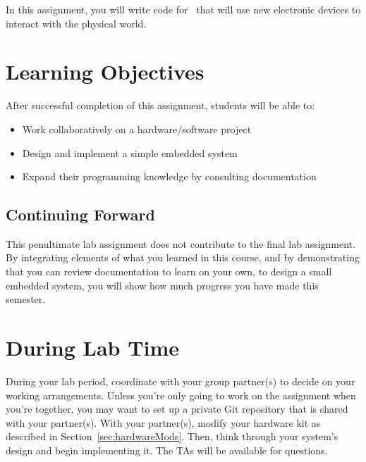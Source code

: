 In this assignment, you will write code for \runtimeenvironment\ that will use new electronic devices to interact with the physical world.


\tableofcontents

\section*{Learning Objectives}

After successful completion of this assignment, students will be able to:
\begin{itemize}
    \item Work collaboratively on a hardware/software project
    \item Design and implement a simple embedded system
    \item Expand their programming knowledge by consulting documentation
\end{itemize}

\subsection*{Continuing Forward}

This penultimate lab assignment does not contribute to the final lab assignment.
By integrating elements of what you learned in this course, and by demonstrating that you can review documentation to learn on your own, to design a small embedded system, you will show how much progress you have made this semester.

\section*{During Lab Time}

During your lab period, coordinate with your group partner(s) to decide on your working arrangements.
Unless you're only going to work on the assignment when you're together, you may want to set up a private Git repository that is shared with your partner(s).
With your partner(s), modify your hardware kit as described in Section~\ref{sec:hardwareMods}.
Then, think through your system's design and begin implementing it.
The TAs will be available for questions.
